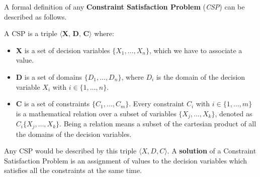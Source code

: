 A formal definition of any \textbf{Constraint Satisfaction Problem} (\textit{CSP}) can be described as follows.
\begin{definition}
    A CSP is a triple $\langle \textbf{X, D, C} \rangle$ where:
    \begin{itemize}
        \renewcommand{\labelitemi}{-}
        \item \textbf{X} is a set of decision variables $\{X_1, \dots, X_n\}$, which we have to associate a value.
        \item \textbf{D} is a set of domains $\{D_1, \dots, D_n\}$, where $D_i$ is the domain of the decision variable $X_i$ with $i \in \{1, \dots, n\}$.
        \item \textbf{C} is a set of constraints $\{C_1, \dots, C_m\}$. Every constraint $C_i$ with $i \in \{1, \dots, m\}$ is a mathematical relation over a subset of variables $\{X_j, \dots, X_k\}$, denoted as $C_i\{X_j, \dots, X_k\}$. Being a relation means a subset of the cartesian product of all the domains of the decision variables.
    \end{itemize}
\end{definition}
Any CSP would be described by this triple $\langle X, D, C\rangle$. A \textbf{solution} of a Constraint Satisfaction Problem is an assignment of values to the 
decision variables which satisfies all the constraints at the same time.